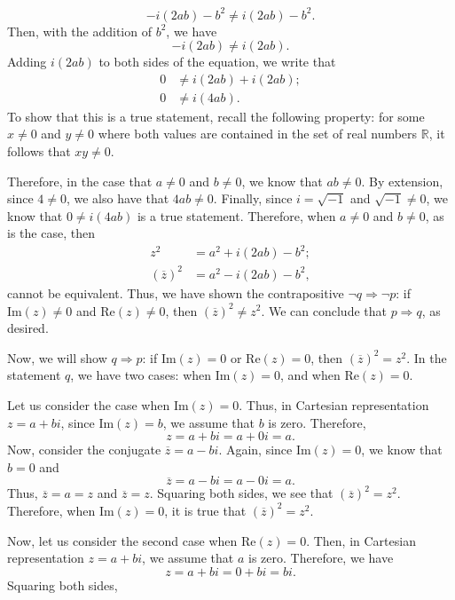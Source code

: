\documentclass[12pt]{exam}
\begin{document}
\begin{questions}
\begin{parts}
\begin{equation*}
- i(2ab) -b^2 \neq i(2ab) - b^2. 
\end{equation*}
Then, with the addition of $b^2$, we have
\begin{equation*}
- i(2ab)  \neq i(2ab) . 
\end{equation*}
Adding $i(2ab)$ to both sides of the equation, we write that 
\begin{align*}
0 &\neq i(2ab) +i(2ab) ;\\
0 &\neq i(4ab) . 
\end{align*}
To show that this is a true statement, recall the following property: for some $x \neq 0$ and $y \neq 0$ where both values are contained in the set of real numbers $\mathbb R$, it follows that $xy \neq 0$.
\par
Therefore, in the case that $a \neq 0$ and $b \neq 0$, we know that $ab \neq 0$. By extension, since $4\neq 0$, we also have that $4ab \neq 0$. Finally, since $i = \sqrt{-1}$ and $\sqrt{-1} \neq 0$, we know that $0 \neq i(4ab)$ is a true statement. Therefore, when $a \neq 0$ and $b \neq 0$, as is the case, then 
\begin{align*}
z^2 &= a^2 + i(2ab) - b^2 ;\\
\left(\overline z\right)^2 &= a^2 - i(2ab) -b^2,
\end{align*}
cannot be equivalent. Thus, we have shown the contrapositive $\neg q \Rightarrow \neg p$: if $\textrm{Im}(z) \neq 0$ and $\textrm{Re}(z) \neq 0$, then $\left(\overline z\right)^2 \neq z^2$. We can conclude that $p \Rightarrow q$, as desired.
\par
Now, we will show $q \Rightarrow p$: if $\textrm{Im}(z) = 0$ or $\textrm{Re}(z) = 0$, then $\left(\overline z\right)^2 = z^2$. In the statement $q$, we have two cases: when $\textrm{Im}(z) = 0$, and when $\textrm{Re}(z) = 0$. 
\par
Let us consider the case when $\textrm{Im}(z) = 0$. Thus, in Cartesian representation $z = a + bi$, since $\textrm{Im}(z) = b$, we assume that $b$ is zero. Therefore, $$z = a + bi = a + 0i = a.$$ Now, consider the conjugate $\overline z = a - bi$. Again, since $\textrm{Im}(z) = 0$, we know that $b=0$ and $$\overline z = a - bi = a - 0i = a.$$ Thus, $\overline z = a = z$ and $\overline z = z$. Squaring both sides, we see that $\left(\overline z\right)^2 = z^2$. Therefore, when $\textrm{Im}(z) = 0$, it is true that $\left(\overline z\right)^2 = z^2$.
\par 
Now, let us consider the second case when $\textrm{Re}(z) = 0$. Then, in Cartesian representation $z = a + bi$, we assume that $a$ is zero. Therefore, we have $$z = a + bi = 0 + bi = bi.$$ Squaring both sides, 

\end{parts}
\end{questions}
\end{document}

